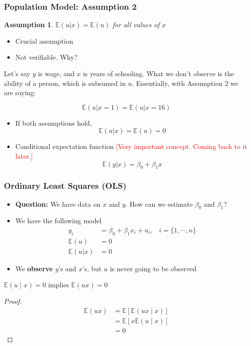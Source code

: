 \documentclass{beamer}
\newtheorem{assumption}{Assumption}[section]
\theoremstyle{plain}
\begin{document}
\begin{frame}
	\frametitle{Population Model: Assumption 2}
	\begin{assumption}
		$\mathbb E(u | x) = \mathbb E(u)$ for all values of $x$
	\end{assumption}
	\begin{itemize}
		\item Crucial assumption
		\item Not verifiable. Why?
	\end{itemize}
	
	\begin{example}
		Let's say $y$  is wage, and $x$ is years of schooling. What we don't observe is the ability of a person, which is subsumed in $u$. Essentially, with Assumption 2 we are saying:
		
		$$\mathbb E(u |x =1) = \mathbb E(u | x=16) $$
	\end{example}
	\pause
	\begin{itemize}
		\item If both assumptions hold,
		$$\mathbb E(u|x) = \mathbb E(u) = 0 $$
		\item Conditional expectation function \textcolor{red}{[Very important concept. Coming back to it later.]}
		$$\mathbb E(y|x) = \beta_0 + \beta_1x  $$
	\end{itemize}
\end{frame}



\begin{frame}
	\frametitle{Ordinary Least Squares (OLS)}
	\begin{itemize}
		\item \textbf{Question:} We have data on $x$ and $y$. How can we estimate $\beta_0$ and $\beta_1$?
		\item We have the following model
		\begin{align*}
			y_i &= \beta_0 + \beta_1 x_i + u_i, \;\;\; i=\{1,\cdots,n\}\\
			\mathbb E(u) &=0\\
			\mathbb E(u|x) &=0
		\end{align*}
		\item We \textbf{observe} $y$'s and $x$'s, but $u$ is never going to be observed
	\end{itemize}
	\begin{lemma}
		$\mathbb E(u\mid x) = 0$ implies $\mathbb E(ux) = 0$
	\end{lemma}
	\begin{proof}
		\begin{align*}
			\mathbb E(ux) &= \mathbb E[\mathbb E(ux\mid x)]\\
			&= \mathbb E[x\mathbb E(u\mid x)]\\
			&= 0
		\end{align*}
	\end{proof}
\end{frame}
\end{document}
